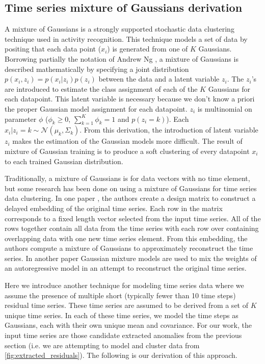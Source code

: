 \subsection{Time series mixture of Gaussians derivation}
A mixture of Gaussians is a strongly supported stochastic data clustering technique used in activity recognition.  This technique models a set of data by positing that each data point ($x_{i}$) is generated from one of $K$ Gaussians.  Borrowing partially the notation of Andrew Ng \cite{Ng2008}, a mixture of Gaussians is described mathematically by specifying a joint distribution $p(x_{i}, z_{i}) = p(x_{i}|z_{i})p(z_{i})$ between the data and a latent variable $z_{i}$.  The $z_{i}$'s are introduced to estimate the class assignment of each of the $K$ Gaussians for each datapoint.  This latent variable is necessary because we don't know a priori the proper Gaussian model assignment for each datapoint.  $z_{i}$ is multinomial on parameter $\phi$  ($\phi_{k} \ge 0$,  $\sum_{k=1}^{K}{ \phi_{k}} = 1$ and $p(z_{i} = k)$).  Each $x_{i}|z_{i} = k \sim \mathcal{N}(\mu_{k}, \Sigma_{k})$.  From this derivation, the introduction of latent variable $z_{i}$ makes the estimation of the Gaussian models more difficult.  The result of mixture of Gaussian training is to produce a soft clustering of every datapoint $x_{i}$ to each trained Gaussian distribution.

Traditionally, a mixture of Gaussians is for data vectors with no time element, but some research has been done on using a mixture of Gaussians for time series data clustering.  In one paper \cite{Eirola2013}, the authors create a design matrix to construct a delayed embedding of the original time series.  Each row in the matrix corresponds to a fixed length vector selected from the input time series.  All of the rows together contain all data from the time series with each row over containing overlapping data with one new time series element.  From this embedding, the authors compute a mixture of Gaussians to approximately reconstruct the time series.  In another paper \cite{Kalliovirta2012} Gaussian mixture models are used to mix the weights of an autoregressive model in an attempt to reconstruct the original time series.

Here we introduce another technique for modeling time series data where we assume the presence of multiple short (typically fewer than 10 time steps) residual time series.  These time series are assumed to be derived from a set of $K$ unique time series.  In each of these time series, we model the time steps as Gaussians, each with their own unique mean and covariance.   For our work, the input time series are those candidate extracted anomalies from the previous section (i.e. we are attempting to model and cluster data from \ref{fig:extracted_residuals}).  The following is our derivation of this approach.

